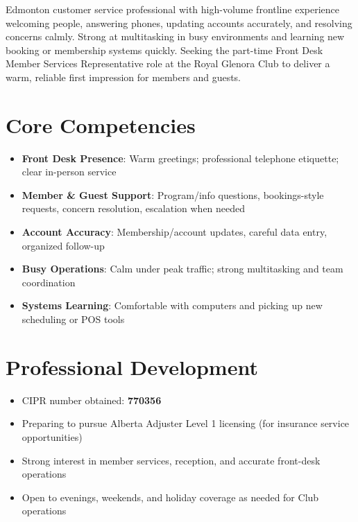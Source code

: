 \documentclass[11pt,a4paper,sans]{moderncv}
\begin{document}
\makecvtitle

\vspace{6pt}
\small{Edmonton customer service professional with high-volume frontline experience welcoming people, answering phones, updating accounts accurately, and resolving concerns calmly. Strong at multitasking in busy environments and learning new booking or membership systems quickly. Seeking the part-time Front Desk Member Services Representative role at the Royal Glenora Club to deliver a warm, reliable first impression for members and guests.}

\section{Core Competencies}
\vspace{1pt}
\begin{itemize}
\item \textbf{Front Desk Presence}: Warm greetings; professional telephone etiquette; clear in-person service
\item \textbf{Member \& Guest Support}: Program/info questions, bookings-style requests, concern resolution, escalation when needed
\item \textbf{Account Accuracy}: Membership/account updates, careful data entry, organized follow-up
\item \textbf{Busy Operations}: Calm under peak traffic; strong multitasking and team coordination
\item \textbf{Systems Learning}: Comfortable with computers and picking up new scheduling or POS tools
\end{itemize}

\section{Professional Development}
\vspace{1pt}
\begin{itemize}
\item CIPR number obtained: \textbf{770356}
\item Preparing to pursue Alberta Adjuster Level 1 licensing (for insurance service opportunities)
\item Strong interest in member services, reception, and accurate front-desk operations
\item Open to evenings, weekends, and holiday coverage as needed for Club operations
\end{itemize}
\end{document}

